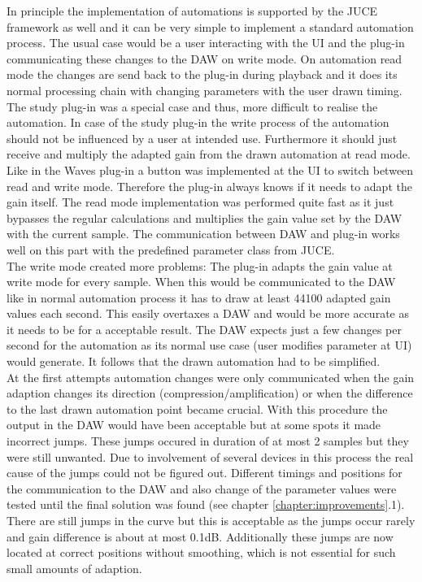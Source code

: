 In principle the implementation of automations is supported by the JUCE framework as well and it can be very simple to implement a standard automation process. The usual case would be a user interacting with the UI and the plug-in communicating these changes to the DAW on write mode. On automation read mode the changes are send back to the plug-in during playback and it does its normal processing chain with changing parameters with the user drawn timing. The study plug-in was a special case and thus, more difficult to realise the automation. In case of the study plug-in the write process of the automation should not be influenced by a user at intended use. Furthermore it should just receive and multiply the adapted gain from the drawn automation at read mode.\\
Like in the Waves plug-in a button was implemented at the UI to switch between read and write mode. Therefore the plug-in always knows if it needs to adapt the gain itself. The read mode implementation was performed quite fast as it just bypasses the regular calculations and multiplies the gain value set by the DAW with the current sample. The communication between DAW and plug-in works well on this part with the predefined parameter class from JUCE.\\
The write mode created more problems: The plug-in adapts the gain value at write mode for every sample. When this would be communicated to the DAW like in normal automation process it has to draw at least 44100 adapted gain values each second. This easily overtaxes a DAW and would be more accurate as it needs to be for a acceptable result. The DAW expects just a few changes per second for the automation as its normal use case (user modifies parameter at UI) would generate. It follows that the drawn automation had to be simplified.\\
At the first attempts automation changes were only communicated when the gain adaption changes its direction (compression/amplification) or when the difference to the last drawn automation point became crucial. With this procedure the output in the DAW would have been acceptable but at some spots it made incorrect jumps. These jumps occured in duration of at most 2 samples but they were still unwanted. Due to involvement of several devices in this process the real cause of the jumps could not be figured out. Different timings and positions for the communication to the DAW and also change of the parameter values were tested until the final solution was found (see chapter \ref{chapter:improvements}.1).\\
There are still jumps in the curve but this is acceptable as the jumps occur rarely and gain difference is about at most 0.1dB. Additionally these jumps are now located at correct positions without smoothing, which is not essential for such small amounts of adaption.\\

